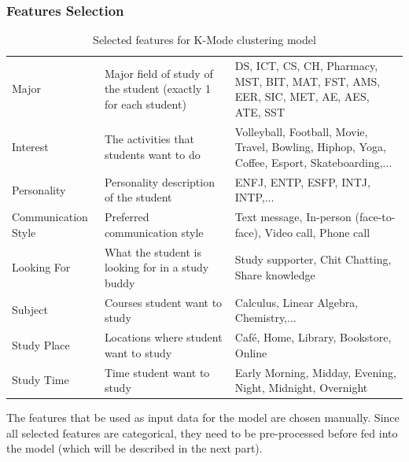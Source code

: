 \documentclass[12pt]{article}
\begin{document}
\subsubsection{Features Selection}
\begin{table}[H] 
    \centering 
    \renewcommand{\arraystretch}{1.2} 
    \begin{tabular}{|>{\centering\arraybackslash}m{4cm}|>{\raggedright\arraybackslash}m{4.5cm}|>{\raggedright\arraybackslash}m{5.5cm}|} 
    \hline 
    \multicolumn{1}{|>{\centering\arraybackslash}m{4cm}|}{\textbf{Feature}} & 
    \multicolumn{1}{>{\centering\arraybackslash}m{4.5cm}|}{\textbf{Description}} & 
    \multicolumn{1}{>{\centering\arraybackslash}m{5.5cm}|}{\textbf{Example}} \\ \hline 
    Major & Major field of study of the student (exactly 1 for each student)& DS, ICT, CS, CH, Pharmacy, MST, BIT, MAT, FST, AMS, EER, SIC, MET, AE, AES, ATE, SST \\ \hline 
    Interest & The activities that students want to do & Volleyball, Football, Movie, Travel, Bowling, Hiphop, Yoga, Coffee, Esport, Skateboarding,...\\ \hline
    Personality & Personality description of the student & ENFJ, ENTP, ESFP, INTJ, INTP,... \\ \hline 
    Communication Style & Preferred communication style& Text message, In-person (face-to-face), Video call, Phone call \\ \hline 
    Looking For & What the student is looking for in a study buddy & Study supporter, Chit Chatting, Share knowledge \\ \hline 
    Subject & Courses student want to study & Calculus, Linear Algebra, Chemistry,... \\ \hline
    Study Place & Locations where student want to study & Café, Home, Library, Bookstore, Online\\ \hline
    Study Time & Time student want to study & Early Morning, Midday, Evening, Night, Midnight, Overnight \\ \hline
    
    \end{tabular} 
    \caption{Selected features for K-Mode clustering model} 
\end{table}

The features that be used as input data for the model are chosen manually. Since all selected features are categorical, they need to be pre-processed before fed into the model (which will be described in the next part).
\end{document}
